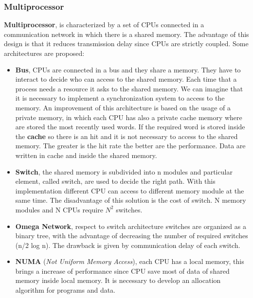 \documentclass[11pt,a4paper]{article}
\begin{document}
\subsubsection{Multiprocessor}
\textbf{Multiprocessor}, is characterized by a set of CPUs connected in a communication network in which there is a shared memory. The advantage of this design is that it reduces transmission delay since CPUs are strictly coupled. Some architectures are proposed:
\begin{itemize}
    \item \textbf{Bus}, CPUs are connected in a bus and they share a memory. They have to interact to decide who can access to the shared memory. Each time that a process needs a resource it asks to the shared memory. We can imagine that it is necessary to implement a synchronization system to access to the memory.
 	An improvement of this architecture is based on the usage of a private memory, in which each CPU has also a private cache memory where are stored the most recently used words. If the required word is stored inside the \textbf{cache} so there is an hit and it is not necessary to access to the shared memory. The greater is the hit rate the better are the performance. Data are written in cache and inside the shared memory.
    \item \textbf{Switch}, the shared memory is subdivided into n modules and particular element, called switch, are used to decide the right path. With this implementation different CPU can access to different memory module at the same time. The disadvantage of this solution is the cost of switch. N memory modules and N CPUs require $N^2$ switches.
    \item \textbf{Omega Network}, respect to switch architecture switches are organized as a binary tree, with the advantage of decreasing the number of required switches (n/2 log n). The drawback is given by communication delay of each switch.
    \item \textbf{NUMA} (\textit{Not Uniform Memory Access}), each CPU has a local memory, this brings a increase of performance since CPU save most of data of shared memory inside local memory. It is necessary to develop an allocation algorithm for programs and data. 
\end{itemize}
\end{document}
